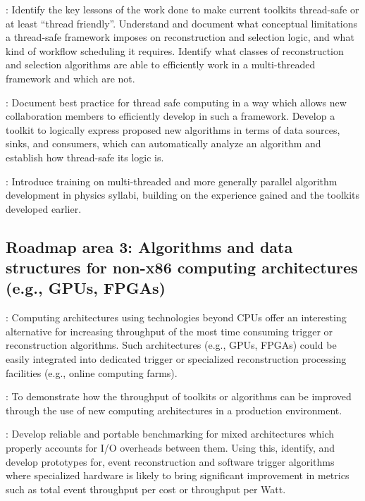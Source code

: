 \vskip 0.5cm
: Identify the key lessons of the work done to make current toolkits thread-safe or at least ``thread friendly''. Understand and document what conceptual limitations
a thread-safe framework imposes on reconstruction and selection logic, and what kind of workflow scheduling it requires. Identify what classes of reconstruction and selection algorithms are able 
to efficiently work in a multi-threaded framework and which are not. 

\vskip 0.5cm
: Document best practice for thread safe computing in a way which allows new collaboration members to efficiently develop in such a framework. Develop a toolkit 
to logically express proposed new algorithms in terms of data sources, sinks, and consumers, which can automatically analyze an algorithm and establish how thread-safe its logic is.

\vskip 0.5cm
: Introduce training on multi-threaded and more generally parallel algorithm development in physics syllabi, building on the experience gained and the toolkits developed earlier.

\subsection{Roadmap area 3: Algorithms and data structures for non-x86 computing architectures (e.g., GPUs, FPGAs)}
: Computing architectures using technologies beyond CPUs offer an interesting alternative for increasing throughput of the most time consuming trigger or reconstruction 
algorithms. Such architectures (e.g., GPUs, FPGAs) could be easily integrated into dedicated trigger or specialized reconstruction processing facilities (e.g., online computing farms).

\vskip 0.5cm
: To demonstrate how the throughput of toolkits or algorithms can be improved through the use of new computing architectures in a production environment. 

\vskip 0.5cm
: Develop reliable and portable benchmarking for mixed architectures which properly accounts for I/O overheads between them. Using this, identify, and develop 
prototypes for, event reconstruction and software trigger algorithms where specialized hardware is likely to bring significant improvement in metrics such as total event throughput per cost or throughput per Watt. 

